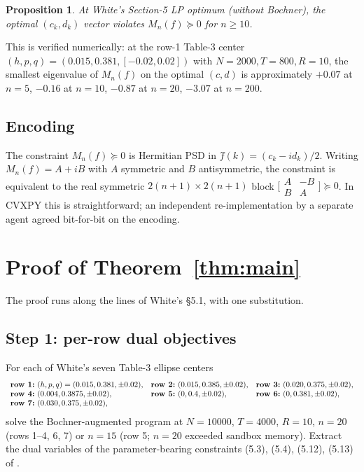 \documentclass[11pt]{article}
\theoremstyle{plain}
\newtheorem{proposition}[theorem]{Proposition}
\theoremstyle{definition}
\begin{document}
\begin{proposition}\label{prop:violation}
At White's Section-5 LP optimum (without Bochner), the optimal
$(c_k, d_k)$ vector violates $M_n(f) \succeq 0$ for $n \ge 10$.
\end{proposition}

This is verified numerically: at the row-1 Table-3 center
$(h, p, q) = (0.015, 0.381, [-0.02, 0.02])$ with
$N = 2000, T = 800, R = 10$, the smallest eigenvalue of $M_n(f)$ on the
optimal $(c, d)$ is approximately $+0.07$ at $n=5$, $-0.16$ at $n=10$,
$-0.87$ at $n=20$, $-3.07$ at $n=200$.

\subsection{Encoding}

The constraint $M_n(f) \succeq 0$ is Hermitian PSD in
$f̂(k) = (c_k - i d_k)/2$. Writing $M_n(f) = A + iB$ with $A$
symmetric and $B$ antisymmetric, the constraint is equivalent to the
real symmetric $2(n+1) \times 2(n+1)$ block
$\bigl[\begin{smallmatrix}A & -B \\ B & A\end{smallmatrix}\bigr]
\succeq 0$. In CVXPY this is straightforward; an independent
re-implementation by a separate agent agreed bit-for-bit on the
encoding.

\section{Proof of Theorem~\ref{thm:main}}

The proof runs along the lines of White's \S5.1, with one substitution.

\subsection{Step 1: per-row dual objectives}

For each of White's seven Table-3 ellipse centers
\[
\begin{array}{l@{\quad}l@{\quad}l}
\textbf{row 1:}\ (h, p, q) = (0.015, 0.381, \pm 0.02), &
\textbf{row 2:}\ (0.015, 0.385, \pm 0.02), &
\textbf{row 3:}\ (0.020, 0.375, \pm 0.02), \\
\textbf{row 4:}\ (0.004, 0.3875, \pm 0.02), &
\textbf{row 5:}\ (0, 0.4, \pm 0.02), &
\textbf{row 6:}\ (0, 0.381, \pm 0.02), \\
\textbf{row 7:}\ (0.030, 0.375, \pm 0.02), &
\end{array}
\]
solve the Bochner-augmented program at $N = 10000$, $T = 4000$, $R = 10$,
$n = 20$ (rows 1--4, 6, 7) or $n = 15$ (row 5; $n = 20$ exceeded
sandbox memory). Extract the dual variables of the parameter-bearing
constraints (5.3), (5.4), (5.12), (5.13) of \cite{White2023}.
\end{document}
